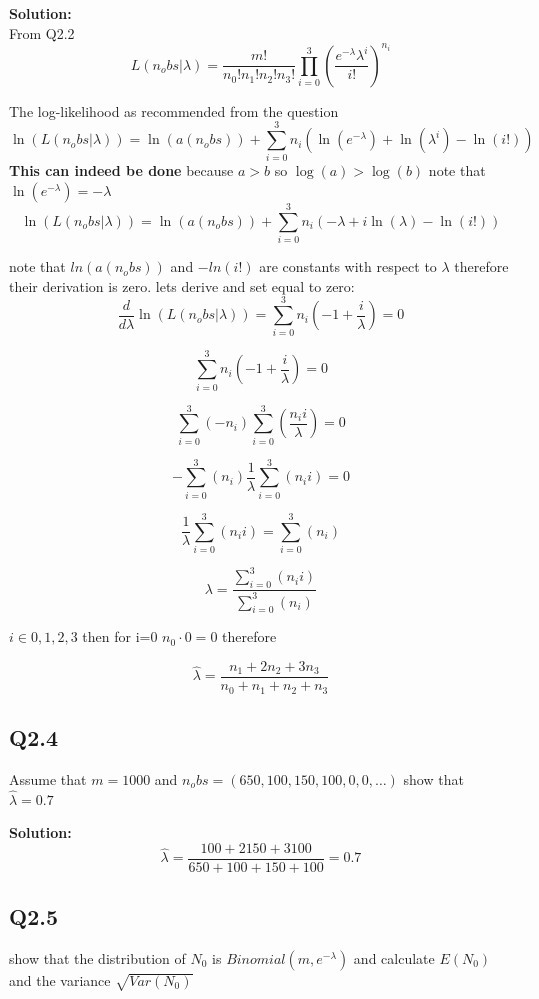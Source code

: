 \indent \textbf{Solution:} \\

From Q2.2
\[
    L(n_obs|\lambda) = \frac{m!}{n_0!n_1!n_2!n_3!} \prod_{i=0}^{3} \left( \frac{e^{-\lambda}\lambda^i}{i!} \right)^{n_i}     
\]

The log-likelihood as recommended from the question 
\[ 
    \ln(L(n_obs|\lambda)) = \ln(a(n_obs)) + \sum_{i=0}^{3} n_i \left(\ln(e^{-\lambda}) + \ln(\lambda^i) - \ln(i!) \right)
\]
\textbf{This can indeed be done} because $a>b$ so $\log(a) > \log(b)$
note that $\ln(e^{-\lambda}) = -\lambda $
\[ 
    \ln(L(n_obs|\lambda)) = \ln(a(n_obs)) + \sum_{i=0}^{3} n_i \left( -\lambda + i\ln(\lambda) - \ln(i!) \right)
\]

note that $ln(a(n_obs))$ and $-ln(i!)$ are constants with respect to $\lambda$ therefore their derivation is zero.
lets derive and set equal to zero:
\[
    \frac{d}{d\lambda} \ln(L(n_obs|\lambda)) = \sum_{i=0}^{3} n_i (-1+\frac{i}{\lambda}) = 0
\]

\[
    \sum_{i=0}^{3} n_i (-1+\frac{i}{\lambda}) = 0    
\]

\[
    \sum_{i=0}^{3}(-n_i)  \sum_{i=0}^{3}(\frac{n_i i}{\lambda}) = 0    
\]

\[
    - \sum_{i=0}^{3}(n_i)  \frac{1}{\lambda}\sum_{i=0}^{3}(n_i i) = 0    
\]

\[
    \frac{1}{\lambda}\sum_{i=0}^{3}(n_i i) = \sum_{i=0}^{3}(n_i)    
\]

\[
    \lambda = \frac{\sum_{i=0}^{3}(n_i i)}{\sum_{i=0}^{3}(n_i)    }  
\]

$i \in {0,1,2,3}$ then for i=0 $n_0 \cdot 0 = 0 $ therefore

\[
   \hat{\lambda} = \frac{n_1 + 2 n_2  + 3 n_3  }{n_0 + n_1 + n_2 + n_3}  
\]

\subsection{Q2.4}
Assume that $m = 1000$ and $n_obs = (650,100,150,100,0,0,\dots)$ show that $\hat{\lambda} = 0.7 $

\indent \textbf{Solution:} \\
\[
   \hat{\lambda} = \frac{100 + 2 150  + 3 100  }{650 + 100 + 150 + 100} = 0.7  
\]

\subsection{Q2.5}
show that the distribution of $N_0$ is $Binomial(m,e^{-\lambda})$ and calculate $E(N_0)$
and the variance $\sqrt{Var(N_0)}$






